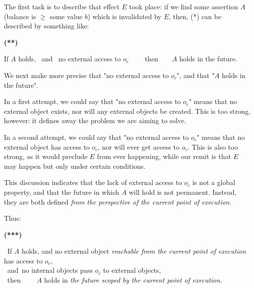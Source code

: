 
\noindent 
The first task is to describe that effect  $E$ took place: if we  find  some assertion $A$ (\eg  balance is $\geq$ some value $b$)
which is invalidated by $E$, then, (*) can be described by something like:

\vspace{.1cm}

  \begin{minipage}{.05\textwidth}
   \textbf{(**)}
\end{minipage}
\hfill
\begin{minipage}{.95\textwidth}
\begin{flushleft}
If $A$ holds, \  and \     no external access to  $o_c$ \ \ \ \ then\  \ \  \ $A$ holds in the future. 
\end{flushleft}
\end{minipage}

\vspace{.1cm}


\noindent 
We next make more precise that "no external access to  $o_c$", and that "$A$ holds in the future".

In a first attempt, we could say that "no external access to  $o_c$" means  that no external object exists, nor will any external objects be created.
This is too strong, however: it defines away the problem we are aiming to solve.

In a second attempt, we could say that "no external access to  $o_c$" means that no external object has access to $o_c$, nor will ever get access to $o_c$. This is also too strong, as it would preclude $E$ from ever happening, while our remit is that $E$ may happen but only under certain conditions. 

This discussion indicates that the lack of external access to $o_c$ is not a global property, and that the future in which  $A$ will hold is not permanent. 
Instead, they are both defined \emph{from the perspective of the current point of execution}.

Thus:


\vspace{.1cm}

  \begin{minipage}{.05\textwidth}
   \textbf{(***)}
\end{minipage}
\hfill
\begin{minipage}{.95\textwidth}
\begin{flushleft}
\ If $A$ holds,   and  no external object  \emph{reachable from the current point of execution}  has access to $o_c$, \\  
\   and\   no  internal objects pass $o_c$ to external objects,  \\
\ then \ \ \  \ $A$ holds in  \emph{the future scoped by the current point of execution}.  
\end{flushleft}
\end{minipage}

